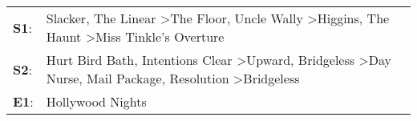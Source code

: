 \begin{supertabular}{p{0.03\textwidth}p{0.92\textwidth}}
 \textbf{S1}:  &                                           Slacker\textsuperscript{}, \enspace The Linear\textsuperscript{} \textgreater \enspace The Floor\textsuperscript{}, \enspace Uncle Wally\textsuperscript{} \textgreater \enspace Higgins\textsuperscript{}, \enspace The Haunt\textsuperscript{} \textgreater \enspace Miss Tinkle's Overture\textsuperscript{}  \enspace  \\
 \textbf{S2}:  &  Hurt Bird Bath\textsuperscript{}, \enspace Intentions Clear\textsuperscript{} \textgreater \enspace Upward\textsuperscript{}, \enspace Bridgeless\textsuperscript{} \textgreater \enspace Day Nurse\textsuperscript{}, \enspace Mail Package\textsuperscript{}, \enspace Resolution\textsuperscript{} \textgreater \enspace Bridgeless\textsuperscript{}  \enspace  \\
 \textbf{E1}:  &                                                                                                                                                                                                                                                                                                                        Hollywood Nights\textsuperscript{}  \enspace  \\
\end{supertabular}
